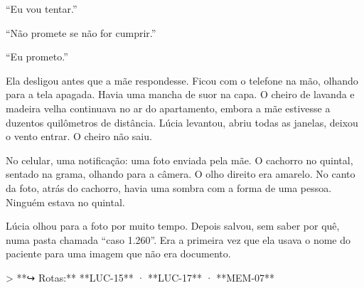 \noindent ``Eu vou tentar.''

\noindent ``Não promete se não for cumprir.''

\noindent ``Eu prometo.''

\noindent Ela desligou antes que a mãe respondesse. Ficou com o telefone na mão, olhando para a tela apagada. Havia uma mancha de suor na capa. O cheiro de lavanda e madeira velha continuava no ar do apartamento, embora a mãe estivesse a duzentos quilômetros de distância. Lúcia levantou, abriu todas as janelas, deixou o vento entrar. O cheiro não saiu.

\noindent No celular, uma notificação: uma foto enviada pela mãe. O cachorro no quintal, sentado na grama, olhando para a câmera. O olho direito era amarelo. No canto da foto, atrás do cachorro, havia uma sombra com a forma de uma pessoa. Ninguém estava no quintal.

\noindent Lúcia olhou para a foto por muito tempo. Depois salvou, sem saber por quê, numa pasta chamada ``caso 1.260''. Era a primeira vez que ela usava o nome do paciente para uma imagem que não era documento.

> **↪ Rotas:** **LUC-15** · **LUC-17** · **MEM-07**
